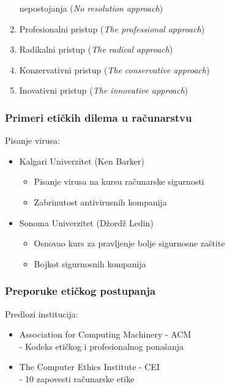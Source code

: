 \documentclass[pdf]{beamer}
\begin{document}
\begin{frame}
\begin{enumerate}
nepostojanja (\textit{No resolution approach})
	\item Profesionalni pristup (\textit{The professional approach})
	\item Radikalni pristup (\textit{The radical approach})
	\item Konzervativni pristup (\textit{The conservative approach})
	\item Inovativni pristup (\textit{The innovative approach})
	\end{enumerate}
	\end{frame}


\begin{frame}
\frametitle{Primeri etičkih dilema u računarstvu}
		Pisanje virusa:
		\begin{itemize}
		\item Kalgari Univerzitet (Ken Barker)
			\begin{itemize}
			\item Pisanje virusa na kursu računarske sigurnosti
			\item Zabrinutost antivirusnih kompanija 
			\end{itemize}
		
		\item Sonoma Univerzitet (Džordž Ledin)
			\begin{itemize}
			\item Osnovao kurs za pravljenje bolje sigurnosne zaštite
			\item Bojkot sigurnosnih kompanija
			\end{itemize}
		\end{itemize}
\end{frame}


\begin{frame}
\frametitle{Preporuke etičkog postupanja}

	Predlozi institucija:
	\begin{itemize}
		\item Association for Computing Machinery - ACM %
		\\- Kodeks etičkog i profesionalnog ponašanja %
		\item The Computer Ethics Institute - CEI %
		\\- 10 zapovesti računarske etike %
	\end{itemize}


\end{frame}
\end{document}
